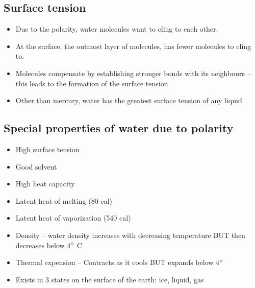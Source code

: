 \subsection{Surface tension}

\begin{itemize}
    \item Due to the polarity, water molecules want to cling
        to each other.
    \item At the surface, the outmost layer of molecules, has fewer
        molecules to cling to.
    \item Molecules compensate by establishing stronger bonds with its
        neighbours -- this leads to the formation of the surface tension
    \item Other than mercury, water has the greatest surface tension of
        any liquid
\end{itemize}

\subsection{Special properties of water due to polarity}

\begin{itemize}
    \item High surface tension
    \item Good solvent
    \item High heat capacity
    \item Latent heat of melting (80 cal)
    \item Latent heat of vaporization (540 cal)
    \item Density -- water density increases with decreasing temperature
        BUT then decreases below 4$\degree$ C
    \item Thermal expension -- Contracts as it cools BUT expands
        below 4$\degree$
    \item Exists in 3 states on the surface of the earth: ice, liquid, gas
\end{itemize}